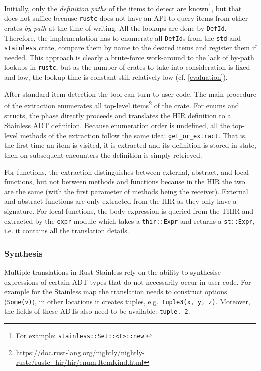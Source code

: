 Initially, only the \emph{definition paths} of the items to detect are
known\footnote{For example: \lstinline!stainless::Set::<T>::new!.}, but that
does not suffice because \lstinline!rustc! does not have an API to query items
from other crates \emph{by path} at the time of writing. All the lookups are
done by \lstinline!DefId!. Therefore, the implementation has to enumerate all
\lstinline!DefId!s from the \lstinline!std! and \lstinline!stainless! crate,
compare them by name to the desired items and register them if needed. This
approach is clearly a brute-force work-around to the lack of by-path lookups in
\lstinline!rustc!, but as the number of crates to take into consideration is
fixed and low, the lookup time is constant still relatively low (cf.
\autoref{evaluation}).

After standard item detection the tool can turn to user code. The main procedure
of the extraction enumerates all top-level
items\footnote{\url{https://doc.rust-lang.org/nightly/nightly-rustc/rustc_hir/hir/enum.ItemKind.html}}
of the crate. For enums and structs, the phase directly proceeds and translates
the HIR definition to a Stainless ADT definition. Because enumeration order is
undefined, all the top-level methods of the extraction follow the same idea:
\lstinline!get_or_extract!. That is, the first time an item is visited, it is
extracted and its definition is stored in state, then on subsequent encounters
the definition is simply retrieved.

For functions, the extraction distinguishes between external, abstract, and
local functions, but not between methods and functions because in the HIR the
two are the same (with the first parameter of methods being the receiver).
External and abstract functions are only extracted from the HIR as they only
have a signature. For local functions, the body expression is queried from the
THIR and extracted by the \lstinline!expr! module which takes a
\lstinline!thir::Expr! and returns a \lstinline!st::Expr!, i.e. it contains all
the translation details.

\subsubsection{Synthesis}

Multiple translations in Rust-Stainless rely on the ability to synthesise
expressions of certain ADT types that do not necessarily occur in user code. For
example for the Stainless map the translation needs to construct options
(\passthrough{\lstinline!Some(v)!}), in other locations it creates tuples,
e.g.~\passthrough{\lstinline!Tuple3(x, y, z)!}. Moreover, the fields of these
ADTs also need to be available: \lstinline!tuple._2!.

